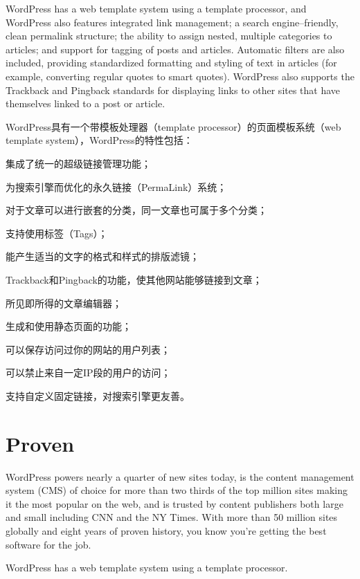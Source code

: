 WordPress has a web template system using a template processor, and WordPress also features integrated link management; a search engine–friendly, clean permalink structure; the ability to assign nested, multiple categories to articles; and support for tagging of posts and articles. Automatic filters are also included, providing standardized formatting and styling of text in articles (for example, converting regular quotes to smart quotes). WordPress also supports the Trackback and Pingback standards for displaying links to other sites that have themselves linked to a post or article.

WordPress具有一个带模板处理器（template processor）的页面模板系统（web template system），WordPress的特性包括：

\begin{compactitem}
\item 集成了统一的超级链接管理功能；
\item 为搜索引擎而优化的永久链接（PermaLink）系统；
\item 对于文章可以进行嵌套的分类，同一文章也可属于多个分类；
\item 支持使用标签（Tags）；
\item 能产生适当的文字的格式和样式的排版滤镜；
\item Trackback和Pingback的功能，使其他网站能够链接到文章；
\item 所见即所得的文章编辑器；
\item 生成和使用静态页面的功能；
\item 可以保存访问过你的网站的用户列表；
\item 可以禁止来自一定IP段的用户的访问；
\item 支持自定义固定链接，对搜索引擎更友善。
\end{compactitem}




\section{Proven}

WordPress powers nearly a quarter of new sites today, is the content management system (CMS) of choice for more than two thirds of the top million sites making it the most popular on the web, and is trusted by content publishers both large and small including CNN and the NY Times. With more than 50 million sites globally and eight years of proven history, you know you’re getting the best software for the job.

WordPress has a web template system using a template processor.



